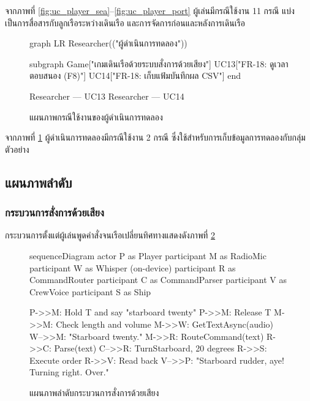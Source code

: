จากภาพที่ \ref{fig:uc_player_sea}--\ref{fig:uc_player_port} ผู้เล่นมีกรณีใช้งาน 11 กรณี แบ่งเป็นการสื่อสารกับลูกเรือระหว่างเดินเรือ และการจัดการก่อนและหลังการเดินเรือ

\begin{figure}[!htbp]
\centering
\begin{mermaid}
graph LR
    Researcher(("ผู้ดำเนินการทดลอง"))

    subgraph Game["เกมเดินเรือด้วยระบบสั่งการด้วยเสียง"]
        UC13["FR-18: ดูเวลาตอบสนอง (F8)"]
        UC14["FR-18: เก็บแฟ้มบันทึกผล CSV"]
    end

    Researcher --- UC13
    Researcher --- UC14
\end{mermaid}
\caption{แผนภาพกรณีใช้งานของผู้ดำเนินการทดลอง}
\label{fig:uc_researcher}
\end{figure}

จากภาพที่ \ref{fig:uc_researcher} ผู้ดำเนินการทดลองมีกรณีใช้งาน 2 กรณี ซึ่งใช้สำหรับการเก็บข้อมูลการทดลองกับกลุ่มตัวอย่าง

\subsection{แผนภาพลำดับ}

\subsubsection{กระบวนการสั่งการด้วยเสียง}

กระบวนการตั้งแต่ผู้เล่นพูดคำสั่งจนเรือเปลี่ยนทิศทางแสดงดังภาพที่ \ref{fig:seq_order}

\begin{figure}[!htbp]
\centering
\begin{mermaid}
sequenceDiagram
    actor P as Player
    participant M as RadioMic
    participant W as Whisper (on-device)
    participant R as CommandRouter
    participant C as CommandParser
    participant V as CrewVoice
    participant S as Ship

    P->>M: Hold T and say "starboard twenty"
    P->>M: Release T
    M->>M: Check length and volume
    M->>W: GetTextAsync(audio)
    W-->>M: "Starboard twenty."
    M->>R: RouteCommand(text)
    R->>C: Parse(text)
    C-->>R: TurnStarboard, 20 degrees
    R->>S: Execute order
    R->>V: Read back
    V-->>P: "Starboard rudder, aye! Turning right. Over."
\end{mermaid}
\caption{แผนภาพลำดับกระบวนการสั่งการด้วยเสียง}
\label{fig:seq_order}
\end{figure}


